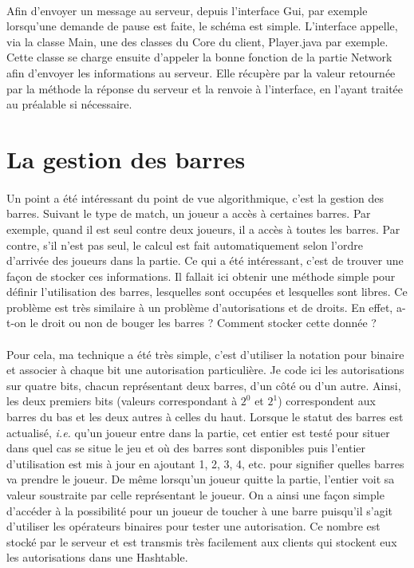 \documentclass[a4paper,12pt]{report}
\begin{document}
\paragraph{}
Afin d'envoyer un message au serveur, depuis l'interface Gui, par exemple lorsqu'une demande de pause est faite, le schéma est simple. L'interface appelle, via la classe Main, une des classes du Core du client, Player.java par exemple. Cette classe se charge ensuite d'appeler la bonne fonction de la partie Network afin d'envoyer les informations au serveur. Elle récupère par la valeur retournée par la méthode la réponse du serveur et la renvoie à l'interface, en l'ayant traitée au préalable si nécessaire.
\section{La gestion des barres}
\paragraph{}
Un point a été intéressant du point de vue algorithmique, c'est la gestion des barres. Suivant le type de match, un joueur a accès à certaines barres. Par exemple, quand il est seul contre deux joueurs, il a accès à toutes les barres. Par contre, s'il n'est pas seul, le calcul est fait automatiquement selon l'ordre d'arrivée des joueurs dans la partie. Ce qui a été intéressant, c'est de trouver une façon de stocker ces informations. Il fallait ici obtenir une méthode simple pour définir \og l'utilisation \fg des barres, lesquelles sont occupées et lesquelles sont libres. Ce problème est très similaire à un problème d'autorisations et de droits. En effet, a-t-on le droit ou non de bouger les barres ? Comment stocker cette donnée ?
\paragraph{}
Pour cela, ma technique a été très simple, c'est d'utiliser la notation pour binaire et associer à chaque bit une autorisation particulière. Je code ici les autorisations sur quatre bits, chacun représentant deux barres, d'un côté ou d'un autre. Ainsi, les deux premiers bits (valeurs correspondant à \(2^0\) et \(2^1\)) correspondent aux barres du bas et les deux autres à celles du haut. Lorsque le statut des barres est actualisé, \emph{i.e. } qu'un joueur entre dans la partie, cet entier est testé pour situer dans quel cas se situe le jeu et où des barres sont disponibles puis l'entier d'utilisation est mis à jour en ajoutant 1, 2, 3, 4, etc. pour signifier quelles barres va prendre le joueur. De même lorsqu'un joueur quitte la partie, l'entier voit sa valeur soustraite par celle représentant le joueur. On a ainsi une façon simple d'accéder à la possibilité pour un joueur de toucher à une barre puisqu'il s'agit d'utiliser les opérateurs binaires pour tester une autorisation. Ce nombre est stocké par le serveur et est transmis très facilement aux clients qui stockent eux les autorisations dans une Hashtable.
\end{document}
